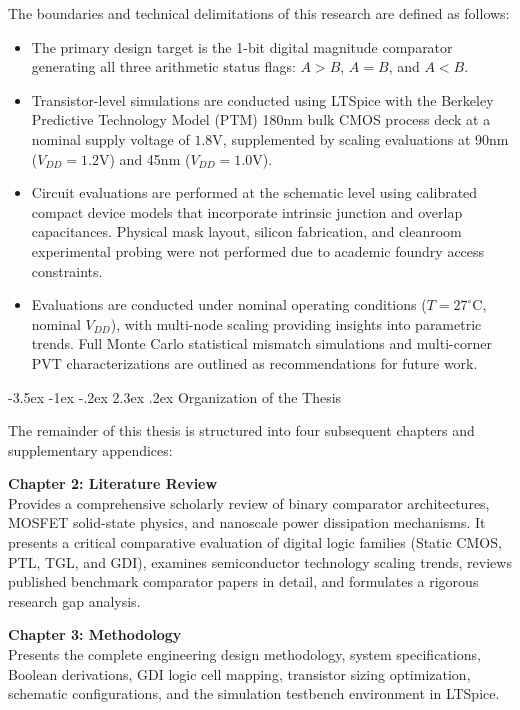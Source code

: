 \documentclass[12pt,a4paper,oneside]{report}
\makeatletter
\renewcommand\section{\@startsection {section}{1}{\z@}%
                                   {-3.5ex \@plus -1ex \@minus -.2ex}%
                                   {2.3ex \@plus.2ex}%
                                   {\normalfont\normalsize\bfseries}}
\makeatother
\begin{document}
The boundaries and technical delimitations of this research are defined as follows:
\begin{itemize}
\item The primary design target is the 1-bit digital magnitude comparator generating all three arithmetic status flags: $A>B$, $A=B$, and $A<B$.
\item Transistor-level simulations are conducted using LTSpice with the Berkeley Predictive Technology Model (PTM) 180nm bulk CMOS process deck at a nominal supply voltage of $1.8\text{V}$, supplemented by scaling evaluations at 90nm ($V_{DD} = 1.2\text{V}$) and 45nm ($V_{DD} = 1.0\text{V}$).
\item Circuit evaluations are performed at the schematic level using calibrated compact device models that incorporate intrinsic junction and overlap capacitances. Physical mask layout, silicon fabrication, and cleanroom experimental probing were not performed due to academic foundry access constraints.
\item Evaluations are conducted under nominal operating conditions ($T = 27^\circ\text{C}$, nominal $V_{DD}$), with multi-node scaling providing insights into parametric trends. Full Monte Carlo statistical mismatch simulations and multi-corner PVT characterizations are outlined as recommendations for future work.
\end{itemize}

\section{Organization of the Thesis}

The remainder of this thesis is structured into four subsequent chapters and supplementary appendices:

\noindent\textbf{Chapter 2: Literature Review}\\
Provides a comprehensive scholarly review of binary comparator architectures, MOSFET solid-state physics, and nanoscale power dissipation mechanisms. It presents a critical comparative evaluation of digital logic families (Static CMOS, PTL, TGL, and GDI), examines semiconductor technology scaling trends, reviews published benchmark comparator papers in detail, and formulates a rigorous research gap analysis.

\noindent\textbf{Chapter 3: Methodology}\\
Presents the complete engineering design methodology, system specifications, Boolean derivations, GDI logic cell mapping, transistor sizing optimization, schematic configurations, and the simulation testbench environment in LTSpice.
\end{document}

